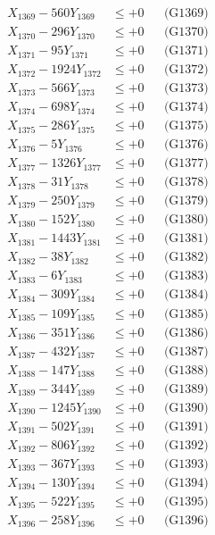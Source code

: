 \documentclass[a4paper,10pt]{article}
\begin{document}
{\begin{align}
X_{1369} - 560Y_{1369} &\leq +0 && \text{(G1369)} \\
X_{1370} - 296Y_{1370} &\leq +0 && \text{(G1370)} \\
\allowbreak
X_{1371} - 95Y_{1371} &\leq +0 && \text{(G1371)} \\
X_{1372} - 1924Y_{1372} &\leq +0 && \text{(G1372)} \\
X_{1373} - 566Y_{1373} &\leq +0 && \text{(G1373)} \\
X_{1374} - 698Y_{1374} &\leq +0 && \text{(G1374)} \\
X_{1375} - 286Y_{1375} &\leq +0 && \text{(G1375)} \\
X_{1376} - 5Y_{1376} &\leq +0 && \text{(G1376)} \\
X_{1377} - 1326Y_{1377} &\leq +0 && \text{(G1377)} \\
X_{1378} - 31Y_{1378} &\leq +0 && \text{(G1378)} \\
X_{1379} - 250Y_{1379} &\leq +0 && \text{(G1379)} \\
X_{1380} - 152Y_{1380} &\leq +0 && \text{(G1380)} \\
\allowbreak
X_{1381} - 1443Y_{1381} &\leq +0 && \text{(G1381)} \\
X_{1382} - 38Y_{1382} &\leq +0 && \text{(G1382)} \\
X_{1383} - 6Y_{1383} &\leq +0 && \text{(G1383)} \\
X_{1384} - 309Y_{1384} &\leq +0 && \text{(G1384)} \\
X_{1385} - 109Y_{1385} &\leq +0 && \text{(G1385)} \\
X_{1386} - 351Y_{1386} &\leq +0 && \text{(G1386)} \\
X_{1387} - 432Y_{1387} &\leq +0 && \text{(G1387)} \\
X_{1388} - 147Y_{1388} &\leq +0 && \text{(G1388)} \\
X_{1389} - 344Y_{1389} &\leq +0 && \text{(G1389)} \\
X_{1390} - 1245Y_{1390} &\leq +0 && \text{(G1390)} \\
\allowbreak
X_{1391} - 502Y_{1391} &\leq +0 && \text{(G1391)} \\
X_{1392} - 806Y_{1392} &\leq +0 && \text{(G1392)} \\
X_{1393} - 367Y_{1393} &\leq +0 && \text{(G1393)} \\
X_{1394} - 130Y_{1394} &\leq +0 && \text{(G1394)} \\
X_{1395} - 522Y_{1395} &\leq +0 && \text{(G1395)} \\
X_{1396} - 258Y_{1396} &\leq +0 && \text{(G1396)} \\

\end{align}}
\end{document}
